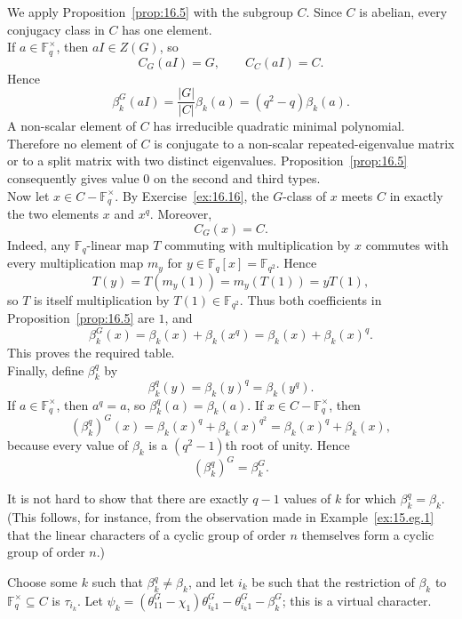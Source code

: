 \documentclass[../Odyssey_Project.tex]{subfiles}
\begin{document}
\begin{solution}
    We apply Proposition~\ref{prop:16.5} with the subgroup $C$. Since $C$ is abelian, every conjugacy class in $C$ has one element.\\
    If $a\in\mathbb{F}_q^\times$, then $aI\in Z(G)$, so
    \[
        C_G(aI)=G,
        \qquad
        C_C(aI)=C.
    \]
    Hence
    \[
        \beta_k^G(aI)
        =
        \frac{|G|}{|C|}\beta_k(a)
        =
        (q^2-q)\beta_k(a).
    \]
    A non-scalar element of $C$ has irreducible quadratic minimal polynomial. Therefore no element of $C$ is conjugate to a non-scalar repeated-eigenvalue matrix or to a split matrix with two distinct eigenvalues. Proposition~\ref{prop:16.5} consequently gives value $0$ on the second and third types.\\
    Now let $x\in C-\mathbb{F}_q^\times$. By Exercise~\ref{ex:16.16}, the $G$-class of $x$ meets $C$ in exactly the two elements $x$ and $x^q$. Moreover,
    \[
        C_G(x)=C.
    \]
    Indeed, any $\mathbb{F}_q$-linear map $T$ commuting with multiplication by $x$ commutes with every multiplication map $m_y$ for $y\in\mathbb{F}_q[x]=\mathbb{F}_{q^2}$. Hence
    \[
        T(y)=T(m_y(1))=m_y(T(1))=yT(1),
    \]
    so $T$ is itself multiplication by $T(1)\in\mathbb{F}_{q^2}$. Thus both coefficients in Proposition~\ref{prop:16.5} are $1$, and
    \[
        \beta_k^G(x)
        =
        \beta_k(x)+\beta_k(x^q)
        =
        \beta_k(x)+\beta_k(x)^q.
    \]
    This proves the required table.\\
    Finally, define $\beta_k^q$ by
    \[
        \beta_k^q(y)=\beta_k(y)^q=\beta_k(y^q).
    \]
    If $a\in\mathbb{F}_q^\times$, then $a^q=a$, so $\beta_k^q(a)=\beta_k(a)$. If $x\in C-\mathbb{F}_q^\times$, then
    \[
        (\beta_k^q)^G(x)
        =
        \beta_k(x)^q+\beta_k(x)^{q^2}
        =
        \beta_k(x)^q+\beta_k(x),
    \]
    because every value of $\beta_k$ is a $(q^2-1)$th root of unity. Hence
    \[
        (\beta_k^q)^G=\beta_k^G.
    \]
\end{solution}

\noindent It is not hard to show that there are exactly $q - 1$ values of $k$ for which $\beta_k^q = \beta_k$. (This follows, for instance, from the observation made in Example~\ref{ex:15.eg.1} that the linear characters of a cyclic group of order $n$ themselves form a cyclic group of order $n$.)

\noindent Choose some $k$ such that $\beta_k^q \neq \beta_k$, and let $i_k$ be such that the restriction of $\beta_k$ to $\mathbb{F}_q^\times \subseteq C$ is $\tau_{i_k}$. Let $\psi_k = (\theta_{11}^G - \chi_1) \theta_{i_k 1}^G - \theta_{i_k 1}^G - \beta_k^G$; this is a virtual character.
\end{document}
